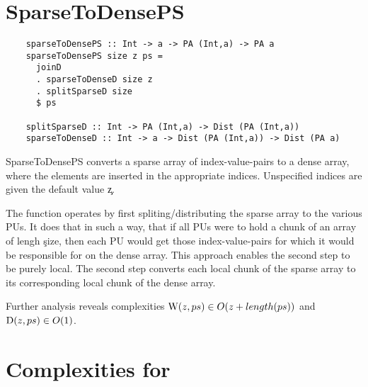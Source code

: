 
\section*{SparseToDensePS}
  \begin{lstlisting}
    sparseToDensePS :: Int -> a -> PA (Int,a) -> PA a
    sparseToDensePS size z ps = 
      joinD
      . sparseToDenseD size z
      . splitSparseD size
      $ ps

    splitSparseD :: Int -> PA (Int,a) -> Dist (PA (Int,a))
    sparseToDenseD :: Int -> a -> Dist (PA (Int,a)) -> Dist (PA a)
  \end{lstlisting}
  SparseToDensePS converts a sparse array of index-value-pairs
  to a dense array, where the elements are inserted in the appropriate
  indices. Unspecified indices are given the default value \c{z}.

  The function operates by first spliting/distributing the sparse array
  to the various PUs. It does that in such a way, that if all PUs were to
  hold a chunk of an array of lengh \c{size}, then each PU would get
  those index-value-pairs for which it would be responsible for on the
  dense array. This approach enables the second step to be purely local.
  The second step converts each local chunk of the sparse array to its corresponding
  local chunk of the dense array.

  Further analysis reveals complexities $\textrm{W}(z,ps) \in O(z + length(ps))$
  and $\textrm{D}(z,ps) \in O(1)$.
  
\section*{Complexities for \ndpv}  
      
